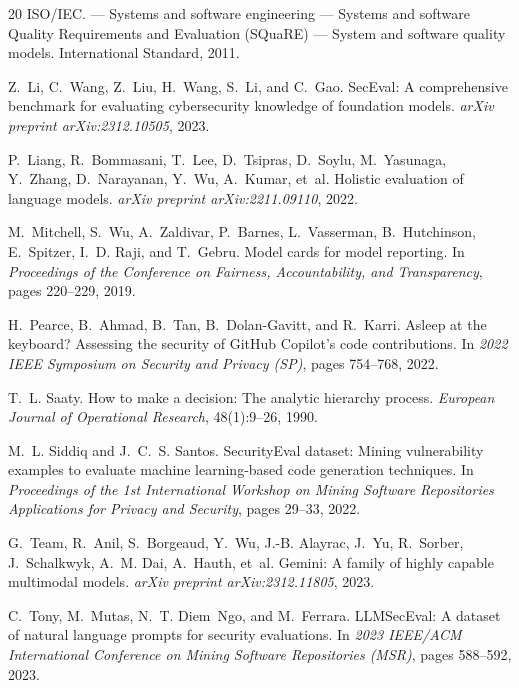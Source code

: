 \documentclass[10pt,twocolumn]{article}
\begin{document}
\begin{thebibliography}{20}
{ISO/IEC}.
 --- Systems and software engineering --- Systems and software Quality Requirements and Evaluation (SQuaRE) --- System and software quality models.
\newblock International Standard, 2011.

Z.~Li, C.~Wang, Z.~Liu, H.~Wang, S.~Li, and C.~Gao.
\newblock SecEval: A comprehensive benchmark for evaluating cybersecurity knowledge of foundation models.
\newblock \emph{arXiv preprint arXiv:2312.10505}, 2023.

P.~Liang, R.~Bommasani, T.~Lee, D.~Tsipras, D.~Soylu, M.~Yasunaga, Y.~Zhang, D.~Narayanan, Y.~Wu, A.~Kumar, et~al.
\newblock Holistic evaluation of language models.
\newblock \emph{arXiv preprint arXiv:2211.09110}, 2022.

M.~Mitchell, S.~Wu, A.~Zaldivar, P.~Barnes, L.~Vasserman, B.~Hutchinson, E.~Spitzer, I.~D. Raji, and T.~Gebru.
\newblock Model cards for model reporting.
\newblock In \emph{Proceedings of the Conference on Fairness, Accountability, and Transparency}, pages 220--229, 2019.

H.~Pearce, B.~Ahmad, B.~Tan, B.~Dolan-Gavitt, and R.~Karri.
\newblock Asleep at the keyboard? Assessing the security of GitHub Copilot's code contributions.
\newblock In \emph{2022 IEEE Symposium on Security and Privacy (SP)}, pages 754--768, 2022.

T.~L. Saaty.
\newblock How to make a decision: The analytic hierarchy process.
\newblock \emph{European Journal of Operational Research}, 48(1):9--26, 1990.

M.~L. Siddiq and J.~C.~S. Santos.
\newblock SecurityEval dataset: Mining vulnerability examples to evaluate machine learning-based code generation techniques.
\newblock In \emph{Proceedings of the 1st International Workshop on Mining Software Repositories Applications for Privacy and Security}, pages 29--33, 2022.

G.~Team, R.~Anil, S.~Borgeaud, Y.~Wu, J.-B. Alayrac, J.~Yu, R.~Sorber, J.~Schalkwyk, A.~M. Dai, A.~Hauth, et~al.
\newblock Gemini: A family of highly capable multimodal models.
\newblock \emph{arXiv preprint arXiv:2312.11805}, 2023.

C.~Tony, M.~Mutas, N.~T. Diem~Ngo, and M.~Ferrara.
\newblock LLMSecEval: A dataset of natural language prompts for security evaluations.
\newblock In \emph{2023 IEEE/ACM International Conference on Mining Software Repositories (MSR)}, pages 588--592, 2023.


\end{thebibliography}
\end{document}
